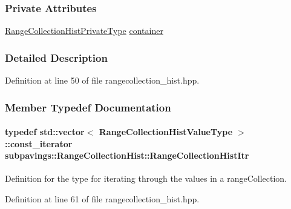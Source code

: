 \subsubsection*{\-Private \-Attributes}
\begin{DoxyCompactItemize}
\item 
\hyperlink{classsubpavings_1_1RangeCollectionHist_ab3b0321ac69a063bda1c70cdb9bf00ec}{\-Range\-Collection\-Hist\-Private\-Type} \hyperlink{classsubpavings_1_1RangeCollectionHist_aba0b943c3580d4ded0a82270589c3df3}{container}
\end{DoxyCompactItemize}


\subsubsection{\-Detailed \-Description}


\-Definition at line 50 of file rangecollection\-\_\-hist.\-hpp.



\subsubsection{\-Member \-Typedef \-Documentation}
\hypertarget{classsubpavings_1_1RangeCollectionHist_a65d6a1cb899b673b28913a7dfb572476}{
\paragraph[{\-Range\-Collection\-Hist\-Itr}]{\setlength{\rightskip}{0pt plus 5cm}typedef std\-::vector$<$ {\bf \-Range\-Collection\-Hist\-Value\-Type} $>$\-::const\-\_\-iterator {\bf subpavings\-::\-Range\-Collection\-Hist\-::\-Range\-Collection\-Hist\-Itr}}}\label{classsubpavings_1_1RangeCollectionHist_a65d6a1cb899b673b28913a7dfb572476}


\-Definition for the type for iterating through the values in a range\-Collection. 



\-Definition at line 61 of file rangecollection\-\_\-hist.\-hpp.

